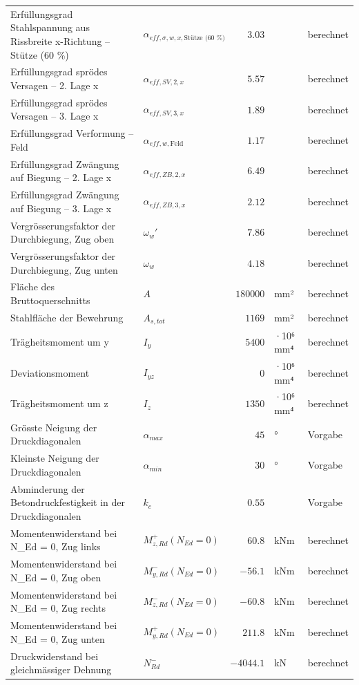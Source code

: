 \documentclass[11pt,a4paper]{article}
\begin{document}
\begin{xltabular}{\linewidth}{>{\raggedright\arraybackslash}Xlrll}
Erfüllungsgrad Stahlspannung aus Rissbreite x-Richtung – Stütze (60 \%) & $\alpha_{eff,\sigma,w,x,\text{Stütze (60 \%)}}$ & $3.03$ &  & berechnet \\
Erfüllungsgrad sprödes Versagen – 2. Lage x & $\alpha_{eff,SV,2,x}$ & $5.57$ &  & berechnet \\
Erfüllungsgrad sprödes Versagen – 3. Lage x & $\alpha_{eff,SV,3,x}$ & $1.89$ &  & berechnet \\
Erfüllungsgrad Verformung – Feld & $\alpha_{eff,w,\text{Feld}}$ & $1.17$ &  & berechnet \\
Erfüllungsgrad Zwängung auf Biegung – 2. Lage x & $\alpha_{eff,ZB,2,x}$ & $6.49$ &  & berechnet \\
Erfüllungsgrad Zwängung auf Biegung – 3. Lage x & $\alpha_{eff,ZB,3,x}$ & $2.12$ &  & berechnet \\
Vergrösserungsfaktor der Durchbiegung, Zug oben & $\omega_w'$ & $7.86$ &  & berechnet \\
Vergrösserungsfaktor der Durchbiegung, Zug unten & $\omega_w$ & $4.18$ &  & berechnet \\
Fläche des Bruttoquerschnitts & $A$ & $180000$ & mm² & berechnet \\
Stahlfläche der Bewehrung & $A_{s,tot}$ & $1169$ & mm² & berechnet \\
Trägheitsmoment um y & $I_y$ & $5400$ & ·10⁶ mm⁴ & berechnet \\
Deviationsmoment & $I_{yz}$ & $0$ & ·10⁶ mm⁴ & berechnet \\
Trägheitsmoment um z & $I_z$ & $1350$ & ·10⁶ mm⁴ & berechnet \\
Grösste Neigung der Druckdiagonalen & $\alpha_{max}$ & $45$ & ° & Vorgabe \\
Kleinste Neigung der Druckdiagonalen & $\alpha_{min}$ & $30$ & ° & Vorgabe \\
Abminderung der Betondruckfestigkeit in der Druckdiagonalen & $k_c$ & $0.55$ &  & Vorgabe \\
Momentenwiderstand bei N\_Ed = 0, Zug links & $M_{z,Rd}^{+}(N_{Ed} = 0)$ & $60.8$ & kNm & berechnet \\
Momentenwiderstand bei N\_Ed = 0, Zug oben & $M_{y,Rd}^{-}(N_{Ed} = 0)$ & $-56.1$ & kNm & berechnet \\
Momentenwiderstand bei N\_Ed = 0, Zug rechts & $M_{z,Rd}^{-}(N_{Ed} = 0)$ & $-60.8$ & kNm & berechnet \\
Momentenwiderstand bei N\_Ed = 0, Zug unten & $M_{y,Rd}^{+}(N_{Ed} = 0)$ & $211.8$ & kNm & berechnet \\
Druckwiderstand bei gleichmässiger Dehnung & $N_{Rd}^{-}$ & $-4044.1$ & kN & berechnet \\

\end{xltabular}
\end{document}
